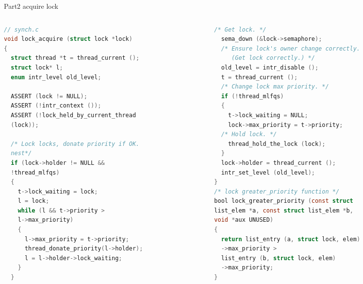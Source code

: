\documentclass{beamer}
\begin{document}
\begin{frame}[fragile]{Part2 acquire lock}
\begin{columns}
\begin{column}{0.5\textwidth}
\begin{lstlisting}[language=C]
// synch.c
void lock_acquire (struct lock *lock)
{
  struct thread *t = thread_current ();
  struct lock* l;
  enum intr_level old_level;

  ASSERT (lock != NULL);
  ASSERT (!intr_context ());
  ASSERT (!lock_held_by_current_thread 
  (lock));

  /* Lock locks, donate priority if OK. 
  nest*/
  if (lock->holder != NULL && 
  !thread_mlfqs)
  {
    t->lock_waiting = lock;
    l = lock;
    while (l && t->priority > 
    l->max_priority)
    {
      l->max_priority = t->priority;
      thread_donate_priority(l->holder);
      l = l->holder->lock_waiting;
    }
  }

\end{lstlisting}
\end{column}
\begin{column}{0.5\textwidth}
\begin{lstlisting}[language=C]
  /* Get lock. */
  sema_down (&lock->semaphore);
  /* Ensure lock's owner change correctly.
     (Get lock correctly.) */
  old_level = intr_disable ();    
  t = thread_current ();
  /* Change lock max priority. */
  if (!thread_mlfqs)
  {
    t->lock_waiting = NULL;
    lock->max_priority = t->priority;
  /* Hold lock. */  
    thread_hold_the_lock (lock);
  }
  lock->holder = thread_current ();
  intr_set_level (old_level);
}
/* lock greater_priority function */
bool lock_greater_priority (const struct 
list_elem *a, const struct list_elem *b, 
void *aux UNUSED)
{
  return list_entry (a, struct lock, elem)
  ->max_priority >
  list_entry (b, struct lock, elem)
  ->max_priority;
}
\end{lstlisting}
\end{column}
\end{columns}
\end{frame}
\end{document}
